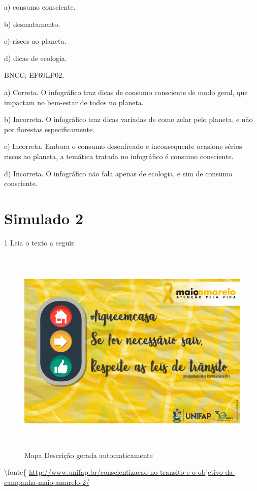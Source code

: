 {a) consumo consciente.

b) desmatamento.

c) riscos ao planeta.

d) dicas de ecologia.

BNCC: EF69LP02.

a) Correta. O infográfico traz dicas de consumo consciente de modo
geral, que impactam no bem-estar de todos no planeta.

b) Incorreta. O infográfico traz dicas variadas de como zelar pelo
planeta, e não por florestas especificamente.

c) Incorreta. Embora o consumo desenfreado e inconsequente ocasione
sérios riscos ao planeta, a temática tratada no infográfico é consumo
consciente.

d) Incorreta. O infográfico não fala apenas de ecologia, e sim de
consumo consciente.

\section{Simulado 2}

\num{1} Leia o texto a seguir.

\begin{figure}
\centering
\includegraphics[width=5.90556in,height=3.95694in]{./imgSAEB_6_POR/media/image38.png}
\caption{Mapa Descrição gerada automaticamente}
\end{figure}

\textbackslash fonte\{
\url{http://www.unifap.br/conscientizacao-no-transito-e-o-objetivo-da-campanha-maio-amarelo-2/}

}
